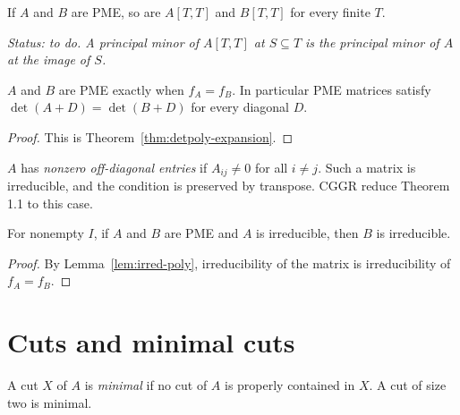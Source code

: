 \begin{lemma}
\label{lem:pme-submatrix}
\leanok
{}
If $A$ and $B$ are PME, so are $A[T,T]$ and $B[T,T]$ for every finite $T$.
\end{lemma}
\noindent\emph{Status: to do. A principal minor of $A[T,T]$ at $S\subseteq T$ is the principal
minor of $A$ at the image of $S$.}

\begin{lemma}
\label{lem:pme-detpoly}
\leanok
{}
$A$ and $B$ are PME exactly when $f_A=f_B$. In particular PME matrices satisfy
$\det(A+D)=\det(B+D)$ for every diagonal $D$.
\end{lemma}
\begin{proof}
\leanok
This is Theorem~\ref{thm:detpoly-expansion}.
\end{proof}

\begin{definition}
\label{def:offdiag}
\leanok
{}
$A$ has \emph{nonzero off-diagonal entries} if $A_{ij}\ne0$ for all $i\ne j$. Such a matrix
is irreducible, and the condition is preserved by transpose. CGGR reduce Theorem 1.1 to
this case.
\end{definition}

\begin{lemma}
\label{lem:pme-irred}
\leanok
{}
For nonempty $I$, if $A$ and $B$ are PME and $A$ is irreducible, then $B$ is irreducible.
\end{lemma}
\begin{proof}
\leanok
By Lemma~\ref{lem:irred-poly}, irreducibility of the matrix is irreducibility of $f_A=f_B$.
\end{proof}

\section{Cuts and minimal cuts}

\begin{definition}
\label{def:minimal-cut}
\leanok
{}
A cut $X$ of $A$ is \emph{minimal} if no cut of $A$ is properly contained in $X$.
A cut of size two is minimal.
\end{definition}

